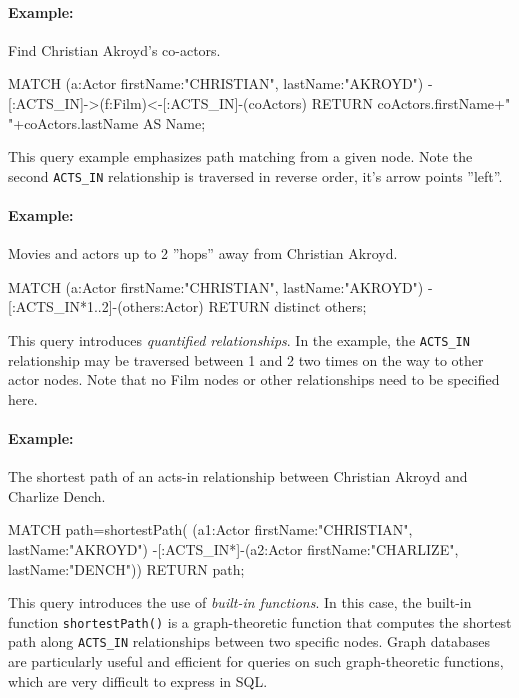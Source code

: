 \begin{withcode}
\paragraph*{Example:} Find Christian Akroyd's co-actors.

\begin{cyphercode}
MATCH (a:Actor {firstName:"CHRISTIAN", lastName:"AKROYD"}) 
      -[:ACTS_IN]->(f:Film)<-[:ACTS_IN]-(coActors) 
RETURN coActors.firstName+" "+coActors.lastName AS Name;
\end{cyphercode}

This query example emphasizes path matching from a given node. Note the second \texttt{ACTS\_IN} relationship is traversed in reverse order, it's arrow points ''left''.

\paragraph*{Example:} Movies and actors up to 2 ''hops'' away from Christian Akroyd.

\begin{cyphercode}
MATCH (a:Actor {firstName:"CHRISTIAN", lastName:"AKROYD"})
      -[:ACTS_IN*1..2]-(others:Actor) 
RETURN distinct others;
\end{cyphercode}

This query introduces \emph{quantified relationships}. In the example, the \texttt{ACTS\_IN} relationship may be traversed between 1 and 2 two times on the way to other actor nodes. Note that no Film nodes or other relationships need to be specified here.

\paragraph*{Example:} The shortest path of an acts-in relationship between Christian Akroyd and Charlize Dench.

\begin{cyphercode}
MATCH path=shortestPath( 
  (a1:Actor {firstName:"CHRISTIAN", lastName:"AKROYD"}) 
  -[:ACTS_IN*]-(a2:Actor {firstName:"CHARLIZE", lastName:"DENCH"})) 
RETURN path;
\end{cyphercode}

This query introduces the use of \emph{built-in functions}. In this case, the built-in function \texttt{shortestPath()} is a graph-theoretic function that computes the shortest path along \texttt{ACTS\_IN} relationships between two specific nodes. Graph databases are particularly useful and efficient for queries on such graph-theoretic functions, which are very difficult to express in SQL.


\end{withcode}
